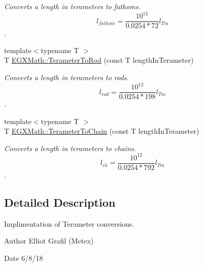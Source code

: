 \begin{DoxyCompactItemize}
\begin{DoxyCompactList}\small\item\em Converts a length in terameters to fathoms. \[ l_{fathom}= \frac{10^{12}}{0.0254 * 72} l_{Tm} \]. \end{DoxyCompactList}\item 
{\footnotesize template$<$typename T $>$ }\\T \mbox{\hyperlink{group___e_g_x_math-_conversions-_length_conversions-_s_i-_terameter-_surveyors_gaa3d08b1f4809bc73a7194ab85c849737}{E\+G\+X\+Math\+::\+Terameter\+To\+Rod}} (const T length\+In\+Terameter)
\begin{DoxyCompactList}\small\item\em Converts a length in terameters to rods. \[ l_{rod}= \frac{10^{12}}{0.0254 * 198} l_{Tm} \]. \end{DoxyCompactList}\item 
{\footnotesize template$<$typename T $>$ }\\T \mbox{\hyperlink{group___e_g_x_math-_conversions-_length_conversions-_s_i-_terameter-_surveyors_gad6ead4722ba7575e34a276dadfdb928b}{E\+G\+X\+Math\+::\+Terameter\+To\+Chain}} (const T length\+In\+Terameter)
\begin{DoxyCompactList}\small\item\em Converts a length in terameters to chains. \[ l_{ch}= \frac{10^{12}}{0.0254 * 792} l_{Tm} \]. \end{DoxyCompactList}\end{DoxyCompactItemize}


\subsection{Detailed Description}
Implimentation of Terameter conversions. 

\begin{DoxyAuthor}{Author}
Elliot Grafil (Metex) 
\end{DoxyAuthor}
\begin{DoxyDate}{Date}
6/8/18 
\end{DoxyDate}
